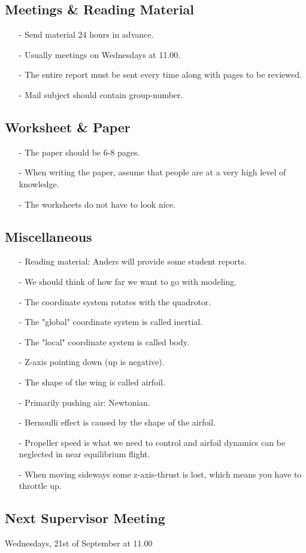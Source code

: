 \subsection{Meetings \& Reading Material}
\begin{itemize}
  \item[-] Send material 24 hours in advance.
  \item[-] Usually meetings on Wednesdays at 11.00.
  \item[-] The entire report must be sent every time along with pages to be reviewed.
  \item[-] Mail subject should contain group-number.
\end{itemize}

\subsection{Worksheet \& Paper}
\begin{itemize}
  \item[-] The paper should be 6-8 pages.
  \item[-] When writing the paper, assume that people are at a very high level of knowledge.
  \item[-] The worksheets do not have to look nice.
\end{itemize}

\subsection{Miscellaneous}
\begin{itemize}
  \item[-] Reading material: Anders will provide some student reports.
  \item[-] We should think of how far we want to go with modeling.
  \item[-] The coordinate system rotates with the quadrotor.
  \item[-] The "global" coordinate system is called inertial.
  \item[-] The "local" coordinate system is called body.
  \item[-] Z-axis pointing down (up is negative).
  \item[-] The shape of the wing is called airfoil.
  \item[-] Primarily pushing air: Newtonian.
  \item[-] Bernoulli effect is caused by the shape of the airfoil.
  \item[-] Propeller speed is what we need to control and airfoil dynamics can be neglected in near equilibrium flight.
  \item[-] When moving sideways some z-axis-thrust is lost, which means you have to throttle up.
\end{itemize}

\subsection{Next Supervisor Meeting}
Wednesdays, 21st of September at 11.00

